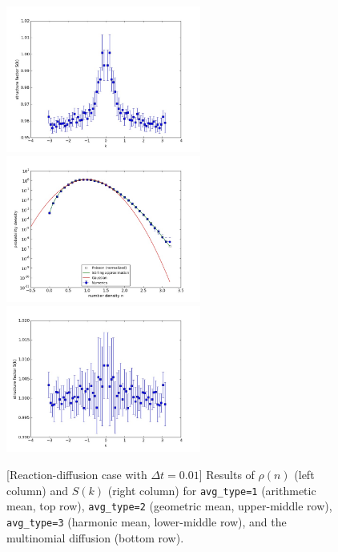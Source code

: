 \documentclass{article}
\begin{document}
\begin{figure}
\includegraphics[width=0.5\linewidth,height=1.9in]{fig1/appendix_dt0.01_react_Sk_avg3.jpg}
\includegraphics[width=0.5\linewidth,height=1.9in]{fig1/appendix_dt0.01_react_hist_mn_ssa.jpg}
\includegraphics[width=0.5\linewidth,height=1.9in]{fig1/appendix_dt0.01_react_Sk_mn_ssa.jpg}
\caption{\label{fig_appendix_react_avg_type}[Reaction-diffusion case with $\Delta t=0.01$] Results of $\rho(n)$ (left column) and $S(k)$ (right column) for \texttt{avg\_type=1} (arithmetic mean, top row), \texttt{avg\_type=2} (geometric mean, upper-middle row), \texttt{avg\_type=3} (harmonic mean, lower-middle row), and the multinomial diffusion (bottom row).
}
\end{figure}
\end{document}

